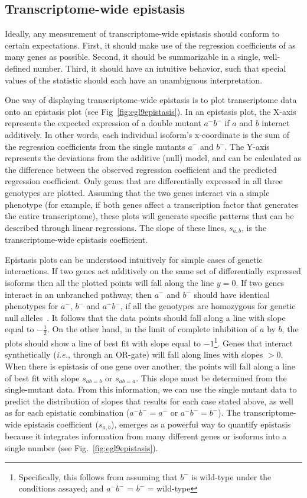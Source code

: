 \documentclass[10pt, onecolumn]{article}
\begin{document}
\subsection*{Transcriptome-wide epistasis}
Ideally, any measurement of transcriptome-wide epistasis should conform to certain
expectations. First, it should make use of the regression coefficients of as
many genes as possible. Second, it should be summarizable in a single,
well-defined number. Third, it should have an intuitive behavior, such that
special values of the statistic should each have an unambiguous interpretation.

One way of displaying transcriptome-wide epistasis is to plot transcriptome data onto
an epistasis plot (see Fig~\ref{fig:egl9epistasis}). In an epistasis plot, the
X-axis represents the expected expression of a double mutant $a^-b^-$ if $a$
and $b$ interact additively.
In other words, each individual isoform's x-coordinate is the sum of the regression
coefficients from the single mutants $a^-$ and $b^-$.
The Y-axis represents the deviations from the additive (null) model, and
can be calculated as the difference between the observed regression coefficient
and the predicted regression coefficient. Only genes that are differentially
expressed in all three genotypes are plotted. Assuming that the two genes interact
via a simple phenotype (for example, if both genes affect a transcription factor
that generates the entire transcriptome), these plots will generate specific
patterns that can be described through linear regressions. The slope of these
lines, $s_{a,b}$, is the transcriptome-wide epistasis coefficient.

Epistasis plots can be understood intuitively for simple cases of genetic
interactions. If two genes act additively on the same set of differentially expressed
isoforms then all the plotted points will fall along the line $y=0$.
If two genes interact in an unbranched pathway, then $a^-$ and $b^-$ should
have identical phenotypes for $a^-$, $b^-$ and $a^-b^-$, if all the genotypes are
homozygous for genetic null alleles~\cite{Huang2006}. It follows that the
data points should fall along a line with slope equal to $-\frac{1}{2}$. On the
other hand, in the limit of complete inhibition of $a$ by $b$, the plots should show
a line of best fit with slope equal to $-1$\footnote{Specifically, this follows
from assuming that $b^-$ is wild-type under the conditions assayed; and
$a^-b^-$ = $b^-$ = wild-type}.
Genes that interact synthetically (\emph{i.e.}, through an OR-gate) will fall
along lines with slopes $>0$. When there is epistasis of one gene over another,
the points will fall along a line of best fit with slope $s_{ab=b}$ or $s_{ab=a}$.
This slope must be determined from the single-mutant data.
From this information, we can use the single mutant data to predict the
distribution of slopes that results for each case stated above, as well as for
each epistatic combination ($a^-b^-=a^-$ or $a^-b^-=b^-$). The transcriptome-wide
epistasis coefficient ($s_{a, b}$), emerges as a powerful way to quantify epistasis
because it integrates information from many different genes or isoforms into a
single number (see Fig.~\ref{fig:egl9epistasis}).
\end{document}
